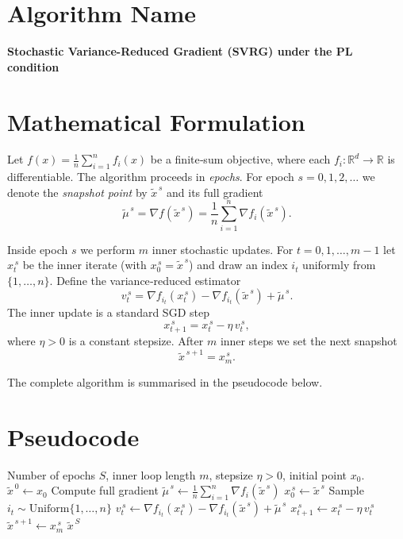 \documentclass{article}
\begin{document}
\section*{Algorithm Name}
\textbf{Stochastic Variance-Reduced Gradient (SVRG) under the PL condition}

\section*{Mathematical Formulation}
Let $f(x)=\frac{1}{n}\sum_{i=1}^{n}f_i(x)$ be a finite‑sum objective, where each $f_i:\mathbb{R}^d\to\mathbb{R}$ is differentiable.
The algorithm proceeds in \emph{epochs}.  
For epoch $s=0,1,2,\dots$ we denote the \emph{snapshot point} by $\tilde{x}^{\,s}$ and its full gradient 
\[
\tilde{\mu}^{\,s}= \nabla f(\tilde{x}^{\,s}) = \frac{1}{n}\sum_{i=1}^{n}\nabla f_i(\tilde{x}^{\,s}).
\]

Inside epoch $s$ we perform $m$ inner stochastic updates.  
For $t=0,1,\dots,m-1$ let $x_t^{\,s}$ be the inner iterate (with $x_0^{\,s}=\tilde{x}^{\,s}$) and draw an index $i_t$ uniformly from $\{1,\dots,n\}$.  
Define the variance‑reduced estimator
\[
v_t^{\,s}= \nabla f_{i_t}(x_t^{\,s})-\nabla f_{i_t}(\tilde{x}^{\,s})+\tilde{\mu}^{\,s}.
\]
The inner update is a standard SGD step
\[
x_{t+1}^{\,s}= x_t^{\,s}-\eta\, v_t^{\,s},
\]
where $\eta>0$ is a constant stepsize.  
After $m$ inner steps we set the next snapshot
\[
\tilde{x}^{\,s+1}=x_m^{\,s}.
\]

The complete algorithm is summarised in the pseudocode below.  

\section*{Pseudocode}
\begin{algorithm}[H]
\caption{SVRG under the PL condition}
\begin{algorithmic}[1]
\Require Number of epochs $S$, inner loop length $m$, stepsize $\eta>0$, initial point $x_0$.
\State $\tilde{x}^{\,0}\gets x_0$
    \State Compute full gradient $\displaystyle \tilde{\mu}^{\,s}\gets \frac{1}{n}\sum_{i=1}^{n}\nabla f_i(\tilde{x}^{\,s})$
    \State $x_0^{\,s}\gets \tilde{x}^{\,s}$
        \State Sample $i_t\sim\text{Uniform}\{1,\dots,n\}$
        \State $v_t^{\,s}\gets \nabla f_{i_t}(x_t^{\,s})-\nabla f_{i_t}(\tilde{x}^{\,s})+\tilde{\mu}^{\,s}$
        \State $x_{t+1}^{\,s}\gets x_t^{\,s}-\eta\,v_t^{\,s}$
    \EndFor
    \State $\tilde{x}^{\,s+1}\gets x_m^{\,s}$
\EndFor
\State \Return $\tilde{x}^{\,S}$
\end{algorithmic}
\end{algorithm}
\end{document}
